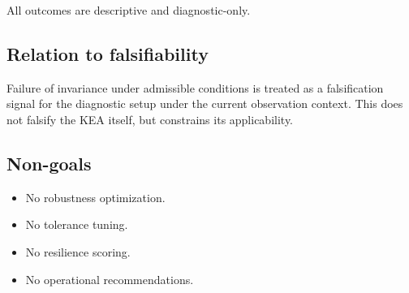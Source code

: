 All outcomes are descriptive and diagnostic-only.

\subsection{Relation to falsifiability}
Failure of invariance under admissible conditions is treated as a falsification
signal for the diagnostic setup under the current observation context.
This does not falsify the KEA itself, but constrains its applicability.

\subsection{Non-goals}
\begin{itemize}
  \item No robustness optimization.
  \item No tolerance tuning.
  \item No resilience scoring.
  \item No operational recommendations.
\end{itemize}
